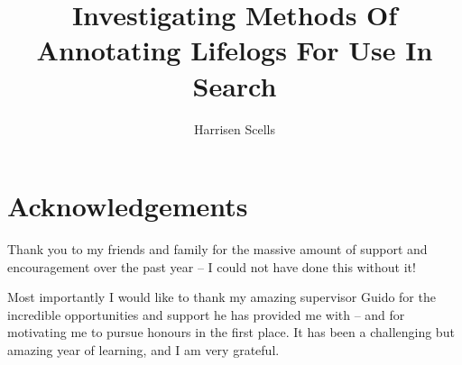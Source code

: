 \documentclass[12pt,a4paper]{book}
\begin{document}
\title{Investigating Methods Of Annotating Lifelogs For Use In Search}

\author{Harrisen Scells}
\insidetitlepage
\setcounter{page}{1}

\chapter*{Acknowledgements}
Thank you to my friends and family for the massive amount of support and encouragement over the past year -- I could not have done this without it!

Most importantly I would like to thank my amazing supervisor Guido for the incredible opportunities and support he has provided me with -- and for motivating me to pursue honours in the first place. It has been a challenging but amazing year of learning, and I am very grateful.
\end{document}
